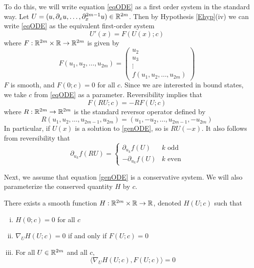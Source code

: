 \documentclass[thesis.tex]{subfiles}
\begin{document}
To do this, we will write equation \eqref{eqODE} as a first order system in the standard way. Let $U = (u, \partial_x u, \dots, \partial_x^{2m-1} u) \in {\mathbb R}^{2m}$. Then by Hypothesis \ref{Ehyp}(iv) we can write \eqref{eqODE} as the equivalent first-order system
\begin{equation}\label{genODE}
U'(x) = F(U(x); c)
\end{equation}
where $F: {\mathbb R}^{2m} \times {\mathbb R} \rightarrow {\mathbb R}^{2m}$ is given by
\begin{equation}\label{defF}
F(u_1, u_2, \dots, u_{2m}) = 
\begin{pmatrix}
u_2 \\ u_3 \\ \vdots \\ f(u_1, u_2, \dots, u_{2m})
\end{pmatrix}
\end{equation}
$F$ is smooth, and $F(0; c) = 0$ for all $c$. Since we are interested in bound states, we take $c$ from \eqref{eqODE} as a parameter. Reversibility implies that
\begin{equation}\label{genODErev}
F(RU; c) = -RF(U; c)
\end{equation}
where $R:{\mathbb R}^{2m} \rightarrow {\mathbb R}^{2m}$ is the standard reversor operator defined by
\begin{equation}\label{reverserR2m}
R(u_1, u_2, \dots, u_{2m-1}, u_{2m}) = (u_1, -u_2, \dots, u_{2m-1}, -u_{2m})
\end{equation}
In particular, if $U(x)$ is a solution to \eqref{genODE}, so is $RU(-x)$. It also follows from reversibility that
\begin{equation}\label{frev}
\partial_{u_k} f(R U) = \begin{cases}
\partial_{u_k} f(U) & k\text{ odd} \\
-\partial_{u_k} f(U) & k\text{ even} 
\end{cases}
\end{equation}

Next, we assume that equation \eqref{genODE} is a conservative system. We will also parameterize the conserved quantity $H$ by $c$.

\begin{hypothesis}\label{Hhyp}
There exists a smooth function $H: {\mathbb R}^{2m} \times {\mathbb R} \rightarrow {\mathbb R}$, denoted $H(U; c)$ such that 
\begin{enumerate}[(i)]
\item $H(0; c) = 0$ for all $c$
\item $\nabla_U H(U; c) = 0$ if and only if $F(U; c) = 0$
\item For all $U \in {\mathbb R}^{2m}$ and all $c$,
\begin{equation}
\langle \nabla_U H(U; c), F(U; c) \rangle = 0
\end{equation}
\end{enumerate}
\end{hypothesis}
\end{document}
